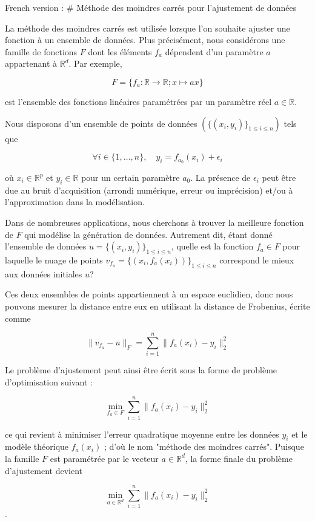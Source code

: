 French version :
# Méthode des moindres carrés pour l'ajustement de données

La méthode des moindres carrés est utilisée lorsque l'on souhaite ajuster une fonction à un ensemble de données. Plus précisément, nous considérons une famille de fonctions \( F \) dont les éléments \( f_a \) dépendent d'un paramètre \( a \) appartenant à \( \mathbb{R}^d \). Par exemple,

\[ F = \{ f_a : \mathbb{R} \rightarrow \mathbb{R}; x \mapsto ax \} \]

est l'ensemble des fonctions linéaires paramétrées par un paramètre réel \( a \in \mathbb{R} \).

Nous disposons d'un ensemble de points de données $( \{(x_i, y_i)\}_{1 \leq i \leq n} )$ tels que

\[ \forall i \in \{1, \ldots, n\}, \quad y_i = f_{a_0}(x_i) + \epsilon_i \]

où \( x_i \in \mathbb{R}^p \) et \( y_i \in \mathbb{R} \) pour un certain paramètre \( a_0 \). La présence de \( \epsilon_i \) peut être due au bruit d'acquisition (arrondi numérique, erreur ou imprécision) et/ou à l'approximation dans la modélisation.

Dans de nombreuses applications, nous cherchons à trouver la meilleure fonction de \( F \) qui modélise la génération de données. Autrement dit, étant donné l'ensemble de données \( u = \{(x_i, y_i)\}_{1 \leq i \leq n} \), quelle est la fonction \( f_a \in F \) pour laquelle le nuage de points \( v_{f_a} = \{(x_i, f_a(x_i))\}_{1 \leq i \leq n} \) correspond le mieux aux données initiales \( u \)?

Ces deux ensembles de points appartiennent à un espace euclidien, donc nous pouvons mesurer la distance entre eux en utilisant la distance de Frobenius, écrite comme

\[ \| v_{f_a} - u \|_F = \sum_{i=1}^{n} \| f_a(x_i) - y_i \|_2^2 \]

Le problème d'ajustement peut ainsi être écrit sous la forme de problème d'optimisation suivant :

\[ \min_{f_a \in F} \sum_{i=1}^{n} \| f_a(x_i) - y_i \|_2^2 \]

ce qui revient à minimiser l'erreur quadratique moyenne entre les données \( y_i \) et le modèle théorique \( f_a(x_i) \) ; d'où le nom "méthode des moindres carrés". Puisque la famille \( F \) est paramétrée par le vecteur \( a \in \mathbb{R}^d \), la forme finale du problème d'ajustement devient

\[ \min_{a \in \mathbb{R}^d} \sum_{i=1}^{n} \| f_a(x_i) - y_i \|_2^2 \].


